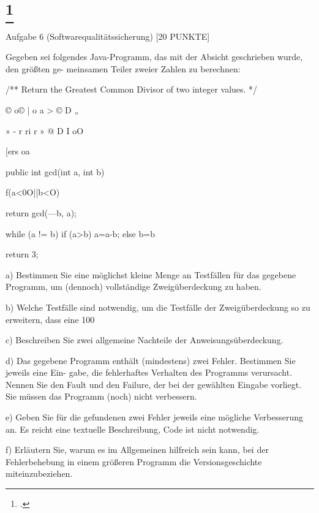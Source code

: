 \documentclass{lehramt-informatik-aufgabe}
\begin{document}
\liAufgabenTitel{}
\section{
\footcite{66116:2020:09}}

Aufgabe 6 (Softwarequalitätssicherung) [20 PUNKTE]

Gegeben sei folgendes Java-Programm, das mit der Absicht geschrieben wurde, den größten ge-
meinsamen Teiler zweier Zahlen zu berechnen:

/** Return the Greatest Common Divisor of two integer values. */

© o© | o a > © D „

» - r ri r
» @ D I oO

[ers
oa

public int gcd(int a, int b) {
f(a<0O||b<O){
return gcd(—b, a);

}
while (a != b) {
if (a>b){
a=a-b;
} else {
b=b%
}
}

return 3;

}

a) Bestimmen Sie eine möglichst kleine Menge an Testfällen für das gegebene Programm, um
(dennoch) vollständige Zweigüberdeckung zu haben.

b) Welche Testfälle sind notwendig, um die Testfälle der Zweigüberdeckung so zu erweitern,
dass eine 100%

c) Beschreiben Sie zwei allgemeine Nachteile der Anweisungsüberdeckung.

d) Das gegebene Programm enthält (mindestens) zwei Fehler. Bestimmen Sie jeweils eine Ein-
gabe, die fehlerhaftes Verhalten des Programms verursacht. Nennen Sie den Fault und den
Failure, der bei der gewählten Eingabe vorliegt. Sie müssen das Programm (noch) nicht
verbessern.

e) Geben Sie für die gefundenen zwei Fehler jeweils eine mögliche Verbesserung an. Es reicht
eine textuelle Beschreibung, Code ist nicht notwendig.

f) Erläutern Sie, warum es im Allgemeinen hilfreich sein kann, bei der Fehlerbehebung in einem
größeren Programm die Versionsgeschichte miteinzubeziehen.
\end{document}
